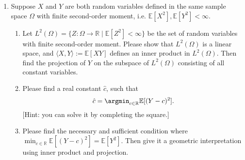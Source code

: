 \begin{exercise}
\begin{enumerate}
\begin{solution}
\begin{enumerate}
					\item
						$\|\mb{y}-\mb{X w}\|_2^2 =
							\|\mb{y}-\hat{\mb{y}}+\hat{\mb{y}}-\mb{X w}\|_2^2 =
							\|\mb{y}-\hat{\mb{y}}\|_2^2 + 2\langle\mb{y}-\hat{\mb{y}}, \hat{\mb{y}}-\mb{X w}\rangle + \|\hat{\mb{y}}-\mb{X w}\|_2^2 $.
						Since $\hat{\mb{y}}-\mb{X w}=\mb{X}(\mb{X}(\mb{X}^{\top}\mb{X})^{-1}\mb{X}^\top\mb{y}-\mb{w})\in\mathcal{C}(\mb{X})$, it follows that $\langle\mb{y}-\hat{\mb{y}}, \hat{\mb{y}}-\mb{X w}\rangle = 0$.
						So $\|\mb{y}-\mb{X w}\|_2^2 = \|\mb{y}-\hat{\mb{y}}\|_2^2 + \|\hat{\mb{y}}-\mb{X w}\|_2^2 \geq \|\mb{y}-\hat{\mb{y}}\|_2^2$, where the equality holds if and only if $\hat{\mb{y}}=\mb{X w}$, i.e. $\mb{w}=(\mb{X}^{\top}\mb{X})^{-1}\mb{X}^\top\mb{y}$.
						And hence $\min_{\mb{w}\in \mathbb{R}^d}\|\mb{y}-\mb{X w}\|_2^2 = \|\mb{y}-\hat{\mb{y}}\|_2^2$.
					\item
						$\min_{\mb{w}\in \mathbb{R}^d}\|\mb{y}-\mb{X w}\|_2^2 = \langle\mb{y}-\hat{\mb{y}} , \mb{y}+\hat{\mb{y}} - 2\hat{\mb{y}}\rangle = \|\mb{y}\|_2^2 - \|\hat{\mb{y}}\|_2^2  - 2\langle\mb{y}-\hat{\mb{y}} , \hat{\mb{y}}\rangle = \|\mb{y}\|_2^2 - \|\hat{\mb{y}}\|_2^2 \leq \|\mb{y}\|_2^2$ $\implies$ $\min_{\mb{w}\in \mathbb{R}^d}\|\mb{y}-\mb{X w}\|_2\le \|\mb{y}\|_2$. The equality holds if and only if $\|\hat{\mb{y}}\|_2=0$ $\iff$ $\hat{\mb{y}}=\mb{0}$ $\iff$ $\langle\mb{y}, \mb{x}\rangle=0$ for any $\mb{x}\in\mathcal{C}(\mb{X})$. In other words, the projection of $\mb{y}$ on $\mathcal{C}(\mb{X})$ is zero, and thus $\mb{y}$ is orthogonal to $\mathcal{C}(\mb{X})$, i.e. $\mb{y}\in\mathcal{N}(\mb{X}^\top)$.
						\qedhere
				\end{enumerate}
			\end{solution}

		\item Suppose $X$ and $Y$ are both random variables defined in the same sample space $\Omega$ with finite second-order moment, i.e. $\mathbb{E}[X^2], \mathbb{E}[Y^2]<\infty$.
			\begin{enumerate}
				\item Let $L^2(\Omega)=\{Z:\Omega\to\mathbb{R}\mid \mathbb{E}[Z^2]<\infty\}$ be the set of random variables with finite second-order moment. Please show that $L^2(\Omega)$ is a linear space, and $\langle X,Y \rangle:=\mathbb{E}[X Y]$ defines an inner product in $L^2(\Omega)$. Then find the projection of $Y$ on the subspace of $L^2(\Omega)$ consisting of all constant variables.
				\item Please find a real constant $\hat{c}$, such that
					\begin{align*}
						\hat{c}=\argmin_{c\in \mathbb{R}}\mathbb{E}[(Y-c)^2].
					\end{align*}
					[Hint: you can solve it by completing the square.]
				\item Please find the necessary and sufficient condition where $\min_{c\in \mathbb{R}}\mathbb{E}[(Y-c)^2]=\mathbb{E}[Y^2]$. Then give it a geometric interpretation using inner product and projection.
			\end{enumerate}


\end{enumerate}
\end{exercise}
